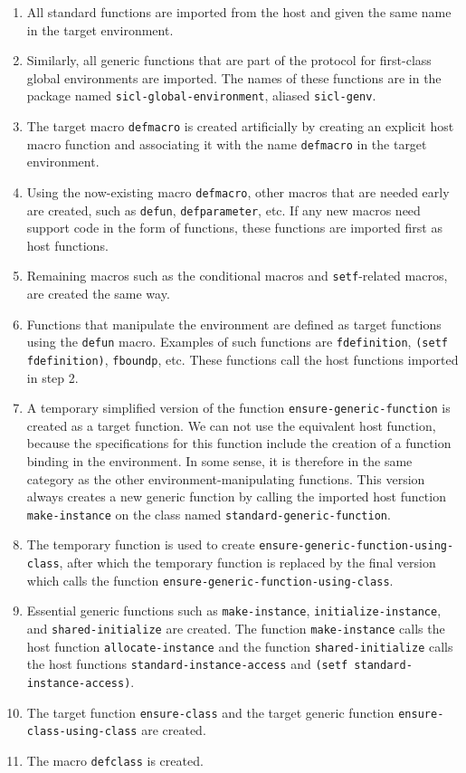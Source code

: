 \begin{enumerate}
\item All standard \commonlisp{} functions are imported from the host
  and given the same name in the target environment.
\item Similarly, all generic functions that are part of the protocol
  for first-class global environments are imported.  The names of
  these functions are in the package named
  \texttt{sicl-global-environment}, aliased \texttt{sicl-genv}.
\item The target macro \texttt{defmacro} is created artificially by
  creating an explicit host macro function and associating it with the
  name \texttt{defmacro} in the target environment.
\item Using the now-existing macro \texttt{defmacro}, other macros
  that are needed early are created, such as \texttt{defun},
  \texttt{defparameter}, etc.  If any new macros need support code in
  the form of functions, these functions are imported first as host
  functions.
\item Remaining macros such as the conditional macros and
  \texttt{setf}-related macros, are created the same way.
\item Functions that manipulate the environment are defined as target
  functions using the \texttt{defun} macro.  Examples of such
  functions are \texttt{fdefinition}, \texttt{(setf fdefinition)},
  \texttt{fboundp}, etc.  These functions call the host functions
  imported in step 2.
\item A temporary simplified version of the function
  \texttt{ensure-generic-function} is created as a target function.
  We can not use the equivalent host function, because the
  specifications for this function include the creation of a function
  binding in the environment.  In some sense, it is therefore in the
  same category as the other environment-manipulating functions.  This
  version always creates a new generic function by calling the
  imported host function \texttt{make-instance} on the class named
  \texttt{standard-generic-function}.
\item The temporary function is used to create
  \texttt{ensure-generic-function-using-class}, after which the
  temporary function is replaced by the final version which calls the
  function \texttt{ensure-generic-function-using-class}.
\item Essential generic functions such as \texttt{make-instance},
  \texttt{initialize-instance}, and \texttt{shared-initialize} are
  created.  The function \texttt{make-instance} calls the host
  function \texttt{allocate-instance} and the function
  \texttt{shared-initialize} calls the host functions
  \texttt{standard-instance-access} and \texttt{(setf
    standard-instance-access)}.
\item The target function \texttt{ensure-class} and the target generic
  function \texttt{ensure-class-using-class} are created.
\item The macro \texttt{defclass} is created.
\end{enumerate}
